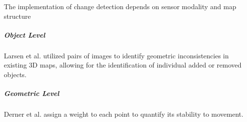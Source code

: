 The implementation of change detection depends on sensor modality and map structure




\subparagraph{Object Level}
Larsen et al. \cite{larsenChangeDetectionModel} utilized pairs of images to identify geometric inconsistencies in existing 3D maps, allowing for the identification of individual added or removed objects.

\subparagraph{Geometric Level}
Derner et al. \cite{dernerChangeDetectionUsing2021} assign a weight to each point to quantify its stability to movement.




